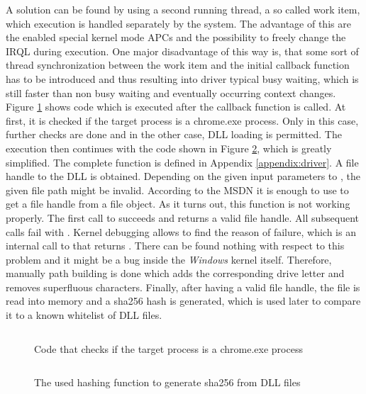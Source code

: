 A solution can be found by using a second running thread, a so called work item, which execution is handled separately by the system. The advantage of this are the enabled special kernel mode \glspl{APC} and the possibility to freely change the \gls{IRQL} during execution. One major disadvantage of this way is, that some sort of thread synchronization between the work item and the initial callback function has to be introduced and thus resulting into driver typical busy waiting, which is still faster than non busy waiting and eventually occurring context changes. Figure \ref{code:code4} shows code which is executed after the callback function is called. At first, it is checked if the target process is a chrome.exe process. Only in this case, further checks are done and in the other case, DLL loading is permitted. The execution then continues with the code shown in Figure \ref{code:code5}, which is greatly simplified. The complete function is defined in Appendix \ref{appendix:driver}. A file handle to the DLL is obtained. Depending on the given input parameters to , the given file path might be invalid. According to the \gls{MSDN} it is enough to use  to get a file handle from a file object. As it turns out, this function is not working properly. The first call to  succeeds and returns a valid file handle. All subsequent calls fail with . Kernel debugging allows to find the reason of failure, which is an internal call to  that returns . There can be found nothing with respect to this problem and it might be a bug inside the \emph{Windows} kernel itself. Therefore, manually path building is done which adds the corresponding drive letter and removes superfluous characters. Finally, after having a valid file handle, the file is read into memory and a sha256 \cite{eckert2014sicherheit} hash is generated, which is used later to compare it to a known whitelist of \gls{DLL} files.

\begin{figure}[tbph]
\inputminted[breakanywhere, breaklines,fontsize=\scriptsize, frame=single, mathescape, linenos, numbersep=5pt, numbersep=5pt, xleftmargin=0pt]{c}{sections/implementation/code4.c}
\caption{Code that checks if the target process is a chrome.exe process}
\label{code:code4}
\end{figure}

\begin{figure}[tbph]
\inputminted[breakanywhere, breaklines,fontsize=\scriptsize, frame=single, mathescape, linenos, numbersep=5pt, numbersep=5pt, xleftmargin=0pt]{c}{sections/implementation/code5.c}
\caption{The used hashing function to generate sha256 from DLL files}
\label{code:code5}
\end{figure}
\medskip

